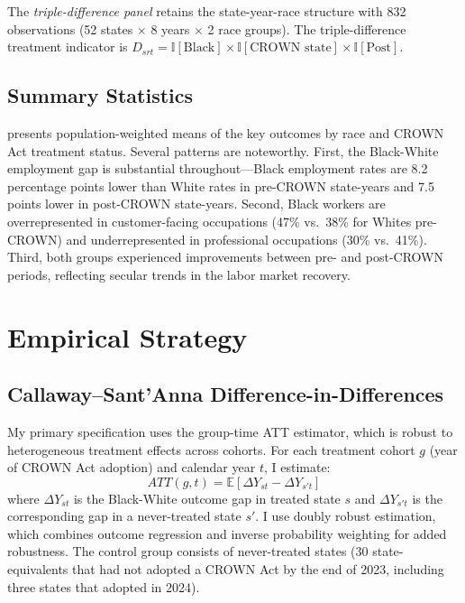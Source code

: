 \documentclass[12pt]{article}
\newcommand{\E}{\mathbb{E}}
\newcommand{\ind}{\mathbb{I}}
\begin{document}
The \textit{triple-difference panel} retains the state-year-race structure with 832 observations (52 states $\times$ 8 years $\times$ 2 race groups). The triple-difference treatment indicator is $D_{srt} = \ind[\text{Black}] \times \ind[\text{CROWN state}] \times \ind[\text{Post}]$.

\subsection{Summary Statistics}

 presents population-weighted means of the key outcomes by race and CROWN Act treatment status. Several patterns are noteworthy. First, the Black-White employment gap is substantial throughout---Black employment rates are 8.2 percentage points lower than White rates in pre-CROWN state-years and 7.5 points lower in post-CROWN state-years. Second, Black workers are overrepresented in customer-facing occupations (47\% vs.\ 38\% for Whites pre-CROWN) and underrepresented in professional occupations (30\% vs.\ 41\%). Third, both groups experienced improvements between pre- and post-CROWN periods, reflecting secular trends in the labor market recovery.



\section{Empirical Strategy}\label{sec:strategy}

\subsection{Callaway--Sant'Anna Difference-in-Differences}

My primary specification uses the \citet{callaway2021} group-time ATT estimator, which is robust to heterogeneous treatment effects across cohorts. For each treatment cohort $g$ (year of CROWN Act adoption) and calendar year $t$, I estimate:
\begin{equation}
ATT(g,t) = \E[\Delta Y_{st} - \Delta Y_{s't}]
\end{equation}
where $\Delta Y_{st}$ is the Black-White outcome gap in treated state $s$ and $\Delta Y_{s't}$ is the corresponding gap in a never-treated state $s'$. I use doubly robust estimation, which combines outcome regression and inverse probability weighting for added robustness. The control group consists of never-treated states (30 state-equivalents that had not adopted a CROWN Act by the end of 2023, including three states that adopted in 2024).
\end{document}
